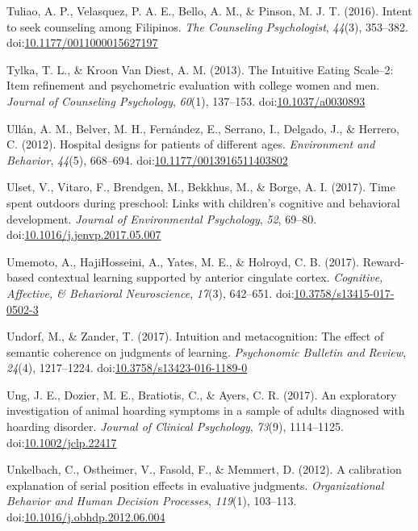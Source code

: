 \documentclass[english,man]{apa6}
\begin{document}
\hypertarget{ref-Tuliao2016}{}
Tuliao, A. P., Velasquez, P. A. E., Bello, A. M., \& Pinson, M. J. T.
(2016). Intent to seek counseling among Filipinos. \emph{The Counseling
Psychologist}, \emph{44}(3), 353--382.
doi:\href{https://doi.org/10.1177/0011000015627197}{10.1177/0011000015627197}

\hypertarget{ref-Tylka2013}{}
Tylka, T. L., \& Kroon Van Diest, A. M. (2013). The Intuitive Eating
Scale--2: Item refinement and psychometric evaluation with college women
and men. \emph{Journal of Counseling Psychology}, \emph{60}(1),
137--153. doi:\href{https://doi.org/10.1037/a0030893}{10.1037/a0030893}

\hypertarget{ref-Ullan2012}{}
Ullán, A. M., Belver, M. H., Fernández, E., Serrano, I., Delgado, J., \&
Herrero, C. (2012). Hospital designs for patients of different ages.
\emph{Environment and Behavior}, \emph{44}(5), 668--694.
doi:\href{https://doi.org/10.1177/0013916511403802}{10.1177/0013916511403802}

\hypertarget{ref-Ulset2017}{}
Ulset, V., Vitaro, F., Brendgen, M., Bekkhus, M., \& Borge, A. I.
(2017). Time spent outdoors during preschool: Links with children's
cognitive and behavioral development. \emph{Journal of Environmental
Psychology}, \emph{52}, 69--80.
doi:\href{https://doi.org/10.1016/j.jenvp.2017.05.007}{10.1016/j.jenvp.2017.05.007}

\hypertarget{ref-Umemoto2017}{}
Umemoto, A., HajiHosseini, A., Yates, M. E., \& Holroyd, C. B. (2017).
Reward-based contextual learning supported by anterior cingulate cortex.
\emph{Cognitive, Affective, \& Behavioral Neuroscience}, \emph{17}(3),
642--651.
doi:\href{https://doi.org/10.3758/s13415-017-0502-3}{10.3758/s13415-017-0502-3}

\hypertarget{ref-Undorf2016}{}
Undorf, M., \& Zander, T. (2017). Intuition and metacognition: The
effect of semantic coherence on judgments of learning. \emph{Psychonomic
Bulletin and Review}, \emph{24}(4), 1217--1224.
doi:\href{https://doi.org/10.3758/s13423-016-1189-0}{10.3758/s13423-016-1189-0}

\hypertarget{ref-Ung2017}{}
Ung, J. E., Dozier, M. E., Bratiotis, C., \& Ayers, C. R. (2017). An
exploratory investigation of animal hoarding symptoms in a sample of
adults diagnosed with hoarding disorder. \emph{Journal of Clinical
Psychology}, \emph{73}(9), 1114--1125.
doi:\href{https://doi.org/10.1002/jclp.22417}{10.1002/jclp.22417}

\hypertarget{ref-Unkelbach2012}{}
Unkelbach, C., Ostheimer, V., Fasold, F., \& Memmert, D. (2012). A
calibration explanation of serial position effects in evaluative
judgments. \emph{Organizational Behavior and Human Decision Processes},
\emph{119}(1), 103--113.
doi:\href{https://doi.org/10.1016/j.obhdp.2012.06.004}{10.1016/j.obhdp.2012.06.004}
\end{document}

